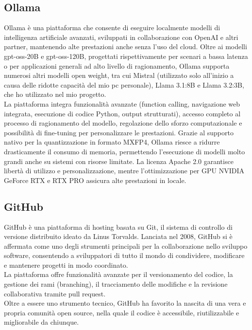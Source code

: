 \subsection{Ollama}
\noindent Ollama è una piattaforma che consente di eseguire localmente modelli di intelligenza artificiale avanzati, sviluppati in collaborazione con OpenAI e altri partner, mantenendo alte prestazioni anche senza l’uso del cloud. 
Oltre ai modelli gpt-oss-20B e gpt-oss-120B, progettati rispettivamente per scenari a bassa latenza o per applicazioni generali ad alto livello di ragionamento, Ollama supporta numerosi altri modelli open weight, tra cui Mistral (utilizzato solo all’inizio a causa delle ridotte capacità del mio pc personale), Llama 3.1:8B e Llama 3.2:3B, che ho utilizzato nel mio progetto.\\ 
La piattaforma integra funzionalità avanzate (function calling, navigazione web integrata, esecuzione di codice Python, output strutturati), accesso completo al processo di ragionamento del modello, regolazione dello sforzo computazionale e possibilità di fine-tuning per personalizzare le prestazioni. 
Grazie al supporto nativo per la quantizzazione in formato MXFP4, Ollama riesce a ridurre drasticamente il consumo di memoria, permettendo l’esecuzione di modelli molto grandi anche su sistemi con risorse limitate. 
La licenza Apache 2.0 garantisce libertà di utilizzo e personalizzazione, mentre l’ottimizzazione per GPU NVIDIA GeForce RTX e RTX PRO assicura alte prestazioni in locale.


\subsection{GitHub}
GitHub è una piattaforma di hosting basata su Git, il sistema di controllo di versione distribuito ideato da Linus Torvalds. Lanciata nel 2008, GitHub si è affermata come uno degli strumenti principali per la collaborazione nello sviluppo software, consentendo a sviluppatori di tutto il mondo di condividere, modificare e mantenere progetti in modo coordinato. \\La piattaforma offre funzionalità avanzate per il versionamento del codice, la gestione dei rami (branching), il tracciamento delle modifiche e la revisione collaborativa tramite pull request. \\Oltre a essere uno strumento tecnico, GitHub ha favorito la nascita di una vera e propria comunità open source, nella quale il codice è accessibile, riutilizzabile e migliorabile da chiunque.

